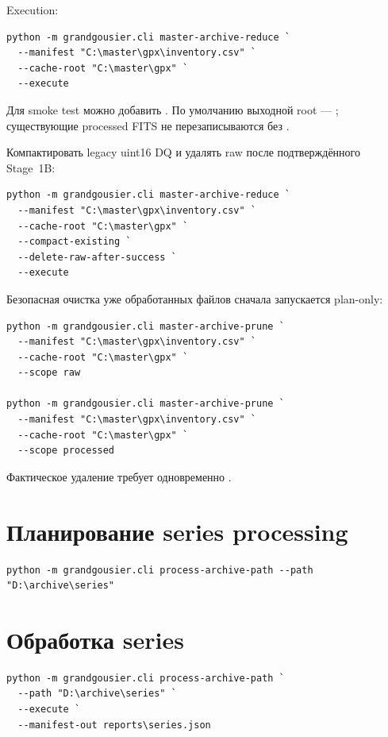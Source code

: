 Execution:

\begin{lstlisting}
python -m grandgousier.cli master-archive-reduce `
  --manifest "C:\master\gpx\inventory.csv" `
  --cache-root "C:\master\gpx" `
  --execute
\end{lstlisting}

Для smoke test можно добавить . По умолчанию выходной root --- ; существующие processed FITS не перезаписываются без .

Компактировать legacy uint16 DQ и удалять raw после подтверждённого Stage~1B:

\begin{lstlisting}
python -m grandgousier.cli master-archive-reduce `
  --manifest "C:\master\gpx\inventory.csv" `
  --cache-root "C:\master\gpx" `
  --compact-existing `
  --delete-raw-after-success `
  --execute
\end{lstlisting}

Безопасная очистка уже обработанных файлов сначала запускается plan-only:

\begin{lstlisting}
python -m grandgousier.cli master-archive-prune `
  --manifest "C:\master\gpx\inventory.csv" `
  --cache-root "C:\master\gpx" `
  --scope raw

python -m grandgousier.cli master-archive-prune `
  --manifest "C:\master\gpx\inventory.csv" `
  --cache-root "C:\master\gpx" `
  --scope processed
\end{lstlisting}

Фактическое удаление требует одновременно .

\section{Планирование series processing}

\begin{lstlisting}
python -m grandgousier.cli process-archive-path --path "D:\archive\series"
\end{lstlisting}

\section{Обработка series}

\begin{lstlisting}
python -m grandgousier.cli process-archive-path `
  --path "D:\archive\series" `
  --execute `
  --manifest-out reports\series.json
\end{lstlisting}

